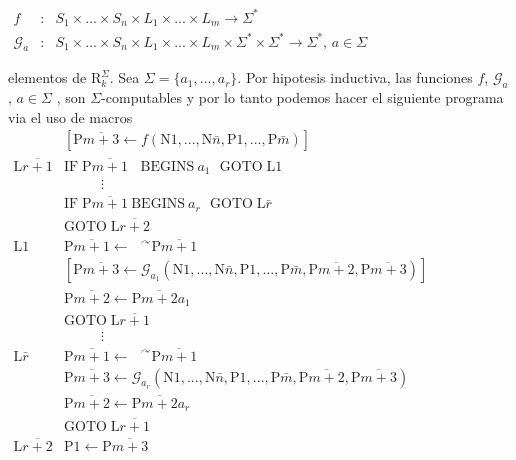 \(\displaystyle \begin{array}{rcl} f & :& S_{1}\times ...\times S_{n}\times L_{1}\times ...\times L_{m}\rightarrow \Sigma ^{\ast } \\ \mathcal{G}_{a} & :& S_{1}\times ...\times S_{n}\times L_{1}\times ...\times L_{m}\times \Sigma ^{\ast }\times \Sigma ^{\ast }\rightarrow \Sigma ^{\ast } \text{, }a\in \Sigma \end{array} \)

elementos de \(\mathrm{R}_{k}^{\Sigma }\). Sea \(\Sigma =\{a_{1},...,a_{r}\}.\) Por hipotesis inductiva, las funciones \(f\), \(\mathcal{G}_{a}\), \(a\in \Sigma \) , son \(\Sigma \)-computables y por lo tanto podemos hacer el siguiente programa via el uso de macros
\(\displaystyle \begin{array}{rl} & \left[ \mathrm{P}\overline{m+3}\leftarrow f(\mathrm{N}1,...,\mathrm{N}\bar{ n},\mathrm{P}1,...,\mathrm{P}\bar{m})\right] \\ \mathrm{L}\overline{r+1} & \mathrm{IF}\;\mathrm{P}\overline{m+1}\ \text{ {B}}\mathrm{EGINS\ }a_{1}\text{ }\mathrm{GOTO}\;\mathrm{L}1 \\ & \ \ \ \ \ \ \ \ \ \ \ \ \vdots \\ & \mathrm{IF}\;\mathrm{P}\overline{m+1}\ \mathrm{BEGINS\ }a_{r}\text{ } \mathrm{GOTO}\;\mathrm{L}\bar{r} \\ & \mathrm{GOTO}\;\mathrm{L}\overline{r+2} \\ \mathrm{L}1 & \mathrm{P}\overline{m+1}\leftarrow \text{ }^{\curvearrowright } \mathrm{P}\overline{m+1} \\ & \left[ \mathrm{P}\overline{m+3}\leftarrow \mathcal{G}_{a_{1}}(\mathrm{N} 1,...,\mathrm{N}\bar{n},\mathrm{P}1,...,\mathrm{P}\bar{m},\mathrm{P} \overline{m+2},\mathrm{P}\overline{m+3})\right] \\ & \mathrm{P}\overline{m+2}\leftarrow \mathrm{P}\overline{m+2}a_{1} \\ & \mathrm{GOTO}\;\mathrm{L}\overline{r+1} \\ & \ \ \ \ \ \ \ \ \ \ \ \ \vdots \\ \mathrm{L}\bar{r} & \mathrm{P}\overline{m+1}\leftarrow \text{ } ^{\curvearrowright }\mathrm{P}\overline{m+1} \\ & \mathrm{P}\overline{m+3}\leftarrow \mathcal{G}_{a_{r}}(\mathrm{N}1,..., \mathrm{N}\bar{n},\mathrm{P}1,...,\mathrm{P}\bar{m},\mathrm{P}\overline{m+2}, \mathrm{P}\overline{m+3}) \\ & \mathrm{P}\overline{m+2}\leftarrow \mathrm{P}\overline{m+2}a_{r} \\ & \mathrm{GOTO}\;\mathrm{L}\overline{r+1} \\ \mathrm{L}\overline{r+2} & \mathrm{P}1\leftarrow \mathrm{P}\overline{m+3} \end{array} \)

